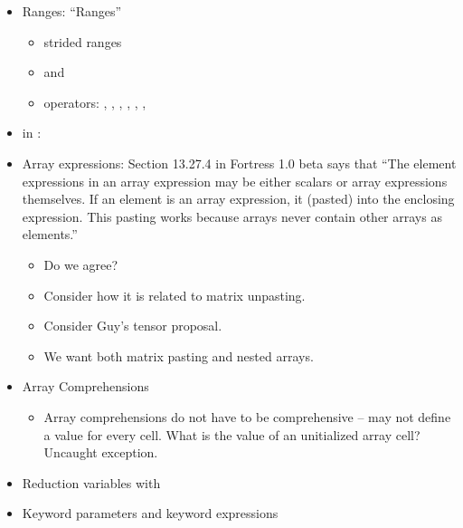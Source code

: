 \begin{itemize}
\item Ranges: ``Ranges''
   \begin{itemize}
   \item strided ranges
   \item {} and 
   \item operators: \EXP{\subset}, \EXP{\subseteq}, \EXP{=}, \EXP{\supseteq},
\EXP{\supset}, \EXP{\cap}, \EXP{\left|\ldots\right|}
   \end{itemize}

\item \EXP{\subseteq} in : 

\item Array expressions:
Section 13.27.4 in Fortress 1.0 beta says that ``The element expressions in an array expression may be either scalars or array expressions themselves. If an element is an array expression, it  (pasted) into the enclosing expression. This pasting works because arrays never contain other arrays as elements.''
 \begin{itemize}
 \item Do we agree?
 \item Consider how it is related to matrix unpasting.
 \item Consider Guy's tensor proposal.
 \item We want both matrix pasting and nested arrays.
 \end{itemize}

\item Array Comprehensions%
 \begin{itemize}
 \item Array comprehensions do not have to be comprehensive -- may not define a value for every cell. What is the value of an unitialized array cell?
Uncaught exception.
 \end{itemize}

\item Reduction variables with 

\item Keyword parameters and keyword expressions


\end{itemize}
